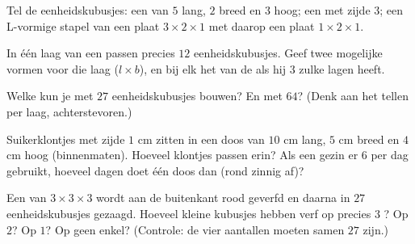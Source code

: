 \begin{exercise}[$\star$]\label{exo:g5:solids:6}
Tel de eenheidskubusjes: een  van $5$ lang, $2$ breed en $3$ hoog; een
 met zijde $3$; een L-vormige stapel van een plaat
$3 \times 2 \times 1$ met daarop een plaat $1 \times 2 \times 1$.
\end{exercise}

\begin{exercise}[$\star$]\label{exo:g5:solids:7}
In één laag van een  passen precies $12$ eenheidskubusjes. Geef twee
mogelijke vormen voor die laag ($l \times b$), en bij elk het  van de
 als hij $3$ zulke lagen heeft.
\end{exercise}

\begin{exercise}[$\star$]\label{exo:g5:solids:8}
Welke  kun je met $27$ eenheidskubusjes bouwen? En met $64$? (Denk aan het
tellen per laag, achterstevoren.)
\end{exercise}

\begin{exercise}[$\star\star$]\label{exo:g5:solids:9}
Suikerklontjes met zijde $1$ cm zitten in een doos van $10$ cm lang, $5$ cm
breed en $4$ cm hoog (binnenmaten). Hoeveel klontjes passen erin? Als een
gezin er $6$ per dag gebruikt, hoeveel dagen doet één doos dan (rond zinnig
af)?
\end{exercise}

\begin{exercise}[$\star\star$]\label{exo:g5:solids:10}
Een  van $3 \times 3 \times 3$ wordt aan de buitenkant rood geverfd en
daarna in $27$ eenheidskubusjes gezaagd. Hoeveel kleine kubusjes hebben verf
op precies $3$ ? Op $2$? Op $1$? Op geen enkel? (Controle: de vier
aantallen moeten samen $27$ zijn.)
\end{exercise}
